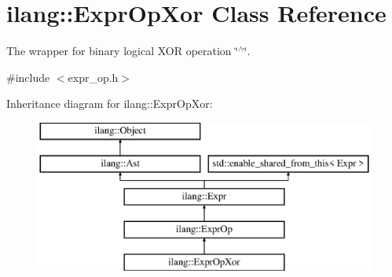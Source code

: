 \hypertarget{classilang_1_1_expr_op_xor}{}\section{ilang\+:\+:Expr\+Op\+Xor Class Reference}
\label{classilang_1_1_expr_op_xor}


The wrapper for binary logical X\+OR operation \char`\"{}$^\wedge$\char`\"{}.  




{\ttfamily \#include $<$expr\+\_\+op.\+h$>$}

Inheritance diagram for ilang\+:\+:Expr\+Op\+Xor\+:\begin{figure}[H]
\begin{center}
\leavevmode
\includegraphics[height=5.000000cm]{classilang_1_1_expr_op_xor}
\end{center}
\end{figure}

